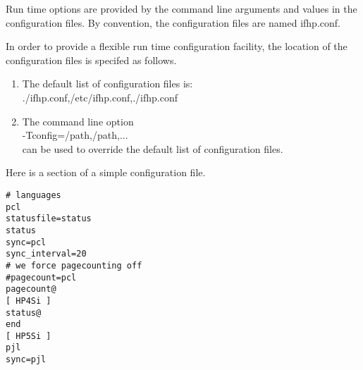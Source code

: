 \documentclass[a4paper]{article}
\begin{document}
Run time options are provided by the
command line arguments and values in the configuration  files.
By convention,
the configuration files are named
{\ttfamily ifhp.conf}.

In order to provide a flexible run time configuration facility,
the location of the configuration files is specifed as follows.
\begin{enumerate}
\item The default list of configuration files is:\\ 
{\ttfamily ./ifhp.conf,/etc/ifhp.conf,./ifhp.conf}
\item The command line option\\ 
{\ttfamily -Tconfig=/path,/path,...}\\ 
can be used to override the default list of configuration files.
\end{enumerate}


Here is a section of a simple configuration file.
\begin{tscreen}
\begin{verbatim}
# languages
pcl
statusfile=status
status
sync=pcl
sync_interval=20
# we force pagecounting off
#pagecount=pcl
pagecount@
[ HP4Si ]
status@
end
[ HP5Si ]
pjl
sync=pjl
\end{verbatim}
\end{tscreen}
\end{document}
